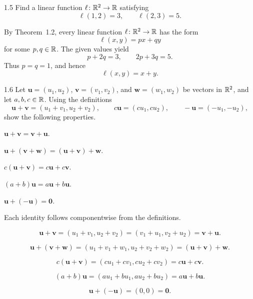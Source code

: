 \documentclass[11pt,oneside]{article}
\begin{document}

\begin{problem}{1.5}
Find a linear function $\ell\colon\mathbb{R}^2\to\mathbb{R}$ satisfying
\[
    \ell(1,2)=3,
    \qquad
    \ell(2,3)=5.
\]
\end{problem}

\begin{solution}
By Theorem~1.2, every linear function $\ell\colon\mathbb{R}^2\to\mathbb{R}$ has the form
\[
    \ell(x,y)=px+qy
\]
for some $p,q\in\mathbb{R}$. The given values yield
\[
    p+2q=3,
    \qquad
    2p+3q=5.
\]
Thus $p=q=1$, and hence
\[
    \boxed{\ell(x,y)=x+y}.
\]
\end{solution}

\begin{problem}{1.6}
Let $\mathbf u=(u_1,u_2)$, $\mathbf v=(v_1,v_2)$, and $\mathbf w=(w_1,w_2)$ be vectors in $\mathbb{R}^2$, and let $a,b,c\in\mathbb{R}$. Using the definitions
\[
    \mathbf u+\mathbf v=(u_1+v_1,u_2+v_2),
    \qquad
    c\mathbf u=(cu_1,cu_2),
    \qquad
    -\mathbf u=(-u_1,-u_2),
\]
show the following properties.
\begin{problemsubparts}
    \item $\mathbf u+\mathbf v=\mathbf v+\mathbf u$.
    \item $\mathbf u+(\mathbf v+\mathbf w)=(\mathbf u+\mathbf v)+\mathbf w$.
    \item $c(\mathbf u+\mathbf v)=c\mathbf u+c\mathbf v$.
    \item $(a+b)\mathbf u=a\mathbf u+b\mathbf u$.
    \item $\mathbf u+(-\mathbf u)=\mathbf 0$.
\end{problemsubparts}
\end{problem}

\begin{solution}
Each identity follows componentwise from the definitions.
\begin{problemsubparts}
    \item
    \[
        \mathbf u+\mathbf v
        =(u_1+v_1,u_2+v_2)
        =(v_1+u_1,v_2+u_2)
        =\mathbf v+\mathbf u.
    \]
    \item
    \[
        \mathbf u+(\mathbf v+\mathbf w)
        =(u_1+v_1+w_1,u_2+v_2+w_2)
        =(\mathbf u+\mathbf v)+\mathbf w.
    \]
    \item
    \[
        c(\mathbf u+\mathbf v)
        =(cu_1+cv_1,cu_2+cv_2)
        =c\mathbf u+c\mathbf v.
    \]
    \item
    \[
        (a+b)\mathbf u
        =(au_1+bu_1,au_2+bu_2)
        =a\mathbf u+b\mathbf u.
    \]
    \item
    \[
        \mathbf u+(-\mathbf u)=(0,0)=\mathbf 0.
    \]
\end{problemsubparts}
\end{solution}
\end{document}
